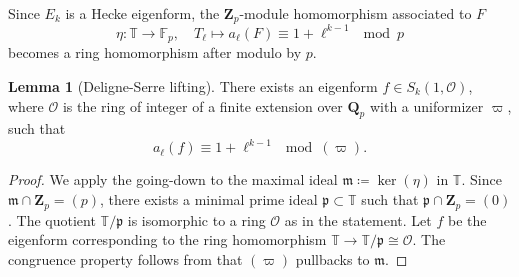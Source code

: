 \documentclass[11pt]{amsart}
\newcommand{\Q}{\mathbf{Q}}  %
\newcommand{\Z}{\mathbf{Z}}  %
\newcommand{\ir}{\mathcal{O}} %
\theoremstyle{definition}
\theoremstyle{definition}
\theoremstyle{definition}
\theoremstyle{definition}
\theoremstyle{definition}
\theoremstyle{definition}
\newtheorem{lemma}[definition]{Lemma}
\begin{document}
Since $E_k$ is a Hecke eigenform,
the $\Z_p$-module homomorphism associated to $F$
\begin{equation*}
    \eta \colon \mathbb{T}\to \mathbb{F}_p,\quad
    T_\ell\mapsto a_\ell(F)\equiv 1+\ell^{k-1} \mod p
\end{equation*}
becomes a ring homomorphism after modulo by $p$.

\begin{lemma}[Deligne-Serre lifting]
    There exists an eigenform $f\in S_k(1,\ir)$,
    where $\ir$ is the ring of integer of a finite extension over $\Q_p$
    with a uniformizer $\varpi$, such that
    \begin{equation*}
        a_\ell(f) \equiv 1+\ell^{k-1} \mod (\varpi).
    \end{equation*}
\end{lemma}
\begin{proof}
    We apply the going-down to the maximal ideal 
    $\mathfrak{m}\coloneqq\ker(\eta)$ in $\mathbb{T}$.
    Since $\mathfrak{m}\cap \Z_p=(p)$,
    there exists a minimal prime ideal
    $\mathfrak{p}\subset \mathbb{T}$ such that $\mathfrak{p}\cap \Z_p=(0)$.
    The quotient $\mathbb{T}/\mathfrak{p}$ is isomorphic to a ring $\ir$
    as in the statement. Let $f$ be the eigenform corresponding
    to the ring homomorphism $\mathbb{T}\to \mathbb{T}/\mathfrak{p}\cong \ir$.
    The congruence property follows from that $(\varpi)$ pullbacks to $\mathfrak{m}$.
\end{proof}
\end{document}
